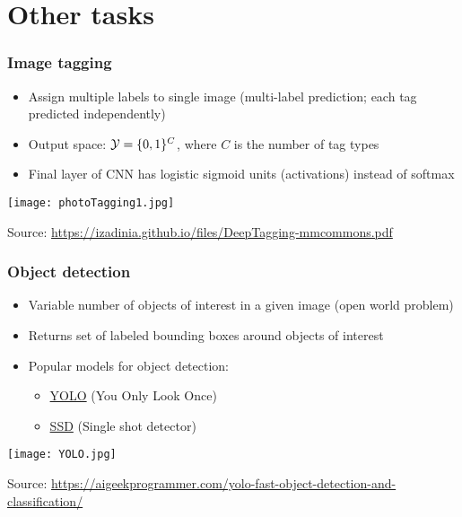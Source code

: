 \documentclass[smaller]{beamer}
\begin{document}
\section{Other  tasks}
\begin{frame}
  \frametitle{Image tagging}
  \pe
  \begin{itemize}[<+->]
  \item Assign multiple labels to single image (multi-label prediction; each tag predicted independently)\pe
  \item Output space: $\mathcal{Y} = \{0,1\}^C$, where $C$ is the number of tag types \pe
  \item Final layer of CNN has logistic sigmoid units (activations) instead of softmax
  \end{itemize}
  \pe

  \begin{center}
    \texttt{[image: photoTagging1.jpg]}

    {\tiny Source: \url{https://izadinia.github.io/files/DeepTagging-mmcommons.pdf}}
  \end{center}
  
\end{frame}


\begin{frame}
  \frametitle{Object detection}
  \pe
  \begin{itemize}
  \item Variable number of objects of interest in a given image (open world problem) \pe
  \item Returns set of labeled bounding boxes around objects of interest \pe
  \item Popular models for object detection: \pe
    \begin{itemize}
    \item \href{https://arxiv.org/pdf/1506.02640.pdf}{YOLO} (You Only Look Once)\pe
    \item \href{https://arxiv.org/pdf/1512.02325.pdf}{SSD} (Single shot detector)\pe
    \end{itemize}
  \end{itemize}

  
  \begin{center}
    \texttt{[image: YOLO.jpg]}

    {\tiny Source: \url{https://aigeekprogrammer.com/yolo-fast-object-detection-and-classification/}}
  \end{center}
  
\end{frame}
\end{document}
